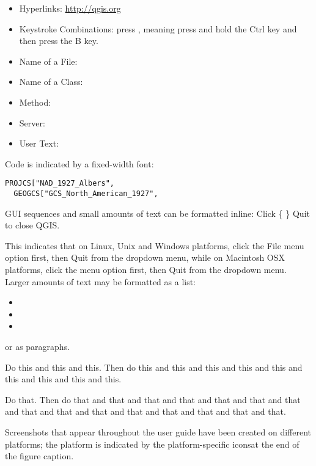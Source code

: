 \begin{itemize}[label=--]
\item Hyperlinks: \url{http://qgis.org}
\item Keystroke Combinations: press , meaning press and hold the Ctrl key and then press the B key.
\item Name of a File: 
\item Name of a Class: 
\item Method: 
\item Server: 
\item User Text: 
\end{itemize}

Code is indicated by a fixed-width font:
\begin{verbatim}
PROJCS["NAD_1927_Albers",
  GEOGCS["GCS_North_American_1927",
\end{verbatim}


GUI sequences and small amounts of text can be formatted inline: Click \{\nix{} \} \arrow Quit to close QGIS.

This indicates that on Linux, Unix and Windows platforms, click the File menu option first, then Quit from the dropdown menu, while on Macintosh OSX platforms, click the \qg menu option first, then Quit from the dropdown menu. Larger amounts of text may be formatted as a list:

\begin{itemize}
\item {}
\item {}
\item {}
\end{itemize}

or as paragraphs.

\nix{} \osx{} Do this and this and this. Then do this and this and this and this and this and this and this and this and this.

\win{}Do that. Then do that and that and that and that and that and that and that and that and that and that and that and that and that and that and that.

Screenshots that appear throughout the user guide have been created on different platforms; the platform is indicated by the platform-specific iconsat the end of the figure caption.
